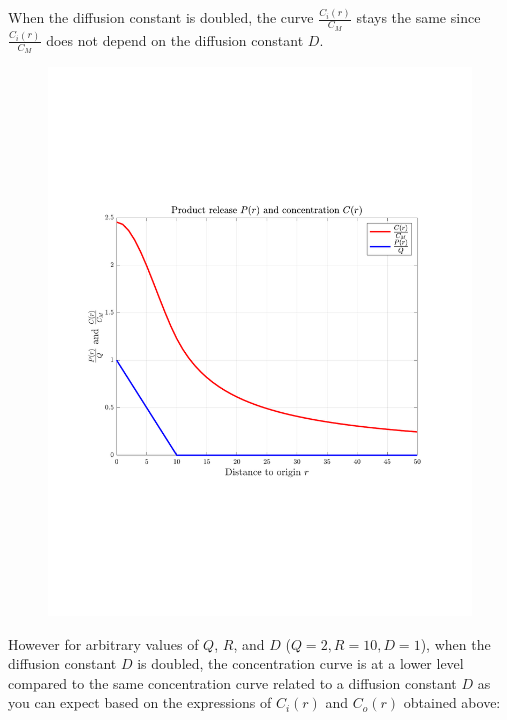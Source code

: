 \documentclass[12pt,twoside]{article}
\begin{document}
When the diffusion constant is doubled, the curve $\frac{C_i(r)}{C_M}$ stays the same since $\frac{C_i(r)}{C_M}$   does not depend on the diffusion constant $D$.

\begin{figure}[H]
 \centering
 \includegraphics[scale=0.5]{concentration}
\end{figure}

However for arbitrary values of $Q$, $R$, and $D$ ($Q=2, R=10, D=1$), when the  diffusion constant $D$ is doubled,  the concentration curve is at a lower level
compared to the same concentration curve related to a diffusion constant $D$ as you can expect based on the expressions of $C_i(r)$ and $C_o(r)$ obtained above:
\end{document}
